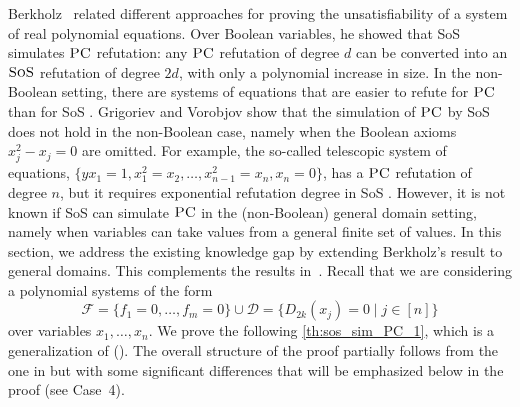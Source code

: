 \documentclass[11pt]{article}
\newcommand{\sos}{\text{\sc{SoS}}}
\newcommand{\F}{\mathcal{F}}
\newcommand{\PC}{\textsc{PC}}
\newcommand{\1}{\textbf{1}}
\newcommand{\Do}{\mathcal{D}}
\newcommand\db{2(d+k-1)}
\newcommand\ds{2^{2k} \log (2\alpha) S}
\newtheorem{theorem}{Theorem}[section]
\begin{document}
Berkholz~\cite{berkholz18} related different approaches for proving the unsatisfiability of a system of real polynomial equations. Over Boolean variables, he showed that SoS simulates $\PC$ refutation: any \(\PC\) refutation of degree \(d\) can be converted into an \(\sos\) refutation of degree \(2d\), with only a polynomial increase in size.
%
In the non-Boolean setting, there are systems of equations that are easier to refute for $\PC$ than for SoS \cite{GrigorievV01}. Grigoriev and Vorobjov \cite{GrigorievV01} show that the simulation of $\PC$ by SoS does not hold in the non-Boolean case, namely when the Boolean axioms $x_j^2-x_j=0$ are omitted. For example, the so-called telescopic system of equations, $\{ yx_1=1, x_1^2=x_2, \ldots, x_{n-1}^2=x_n, x_n=0\}$, has a $\PC$ refutation of degree $n$, but it requires exponential refutation degree in SoS \cite{GrigorievV01}.
However, it is not known if SoS can simulate $\PC$ in the (non-Boolean) general domain setting, namely when variables can take values from a general finite set of values. 
In this section, we address the existing knowledge gap by extending Berkholz's result to general domains. This complements the results in~\cite{GrigorievV01,berkholz18}.
%
%
Recall that we are considering a polynomial systems of the form 
%
\begin{equation}
    \F=\{f_1=0,\ldots,f_m=0\} \cup \Do=\{D_{2k}(x_j)=0\mid j\in[n]\}
\end{equation}
%
over variables $x_1,\ldots,x_n$. We prove the following \cref{th:sos_sim_PC_1}, which is a generalization of (\cite[Lemma 1]{berkholz18}). The overall structure of the proof partially follows from the one in \cite{berkholz18} but with some significant differences that will be emphasized below in the proof (see Case~4).
\end{document}
